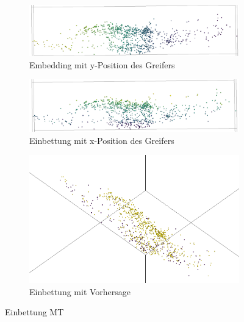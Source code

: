	
	\begin{figure}[h]
		\centering
		\begin{subfigure}[c]{0.49\textwidth}			
			\includegraphics[width=1\textwidth,center]{bilder/Hauptteil/MT_Grapple/emb_y.png}
			\caption{Embedding mit y-Position des Greifers}
			\label{img:Emb_y_MT}	
		\end{subfigure}
		\begin{subfigure}[c]{0.49\textwidth}			
			\includegraphics[width=1\textwidth, center]{bilder/Hauptteil/MT_Grapple/emb_x.png}
			\caption{Einbettung mit x-Position des Greifers}
			\label{img:Emb_x_MT}	
		\end{subfigure}
		\begin{subfigure}[c]{0.6\textwidth}			
		\includegraphics[width=1\textwidth, center]{bilder/Hauptteil/MT_Grapple/emb_res.png}
		\caption{Einbettung mit Vorhersage}
		\label{img:Emb_MT_Vorhersage}	
	\end{subfigure}
		\caption{Einbettung MT}
		\label{img:EmbeddingMT}
	\end{figure}
	
